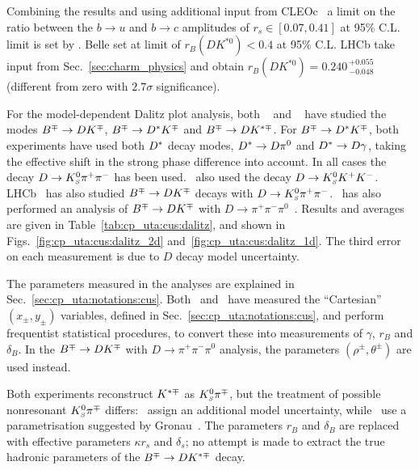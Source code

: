 

Combining the results and using additional input from
CLEOc~\cite{Asner:2008ft,Lowery:2009id} a limit on the ratio between the 
$b \to u$ and $b \to c$ amplitudes of $r_s \in \left[ 0.07,0.41 \right]$ 
at 95\% C.L. limit is set by \babar.
Belle set at limit of $r_B(DK^{*0}) < 0.4$ at 95\% C.L. 
LHCb take input from Sec.~\ref{sec:charm_physics} and obtain $r_B(DK^{*0}) = 0.240 \,^{+0.055}_{-0.048}$ (different from zero with $2.7\sigma$ significance). 

\label{sec:cp_uta:cus:dalitz}

For the model-dependent Dalitz plot analysis, both 
\babar~\cite{Aubert:2008bd} and
\belle~\cite{Poluektov:2010wz,Poluektov:2006ia} have studied the modes 
$B^\mp \to DK^\mp$, $B^\mp \to D^*K^\mp$ and $B^\mp \to DK^{*\mp}$.
For $B^\mp \to D^*K^\mp$,
both experiments have used both $D^*$ decay modes, $D^* \to D\pi^0$ and
$D^* \to D\gamma$, taking the effective shift in the strong phase
difference into account. 
In all cases the decay $D \to K^0_{\scriptscriptstyle S}\pi^+\pi^-$ has been used.
\babar\ also used the decay $D \to K^0_{\scriptscriptstyle S} K^+K^-$.
LHCb~\cite{Aaij:2014iba} has also studied $B^\mp \to DK^\mp$ decays with $D \to K^0_{\scriptscriptstyle S}\pi^+\pi^-$.
\babar\ has also performed an analysis of $B^\mp \to DK^\mp$ with 
$D \to \pi^+\pi^-\pi^0$~\cite{Aubert:2007ii}.
Results and averages are given in Table~\ref{tab:cp_uta:cus:dalitz}, and shown in Figs.~\ref{fig:cp_uta:cus:dalitz_2d} and~\ref{fig:cp_uta:cus:dalitz_1d}.
The third error on each measurement is due to $D$ decay model uncertainty.

The parameters measured in the analyses are explained in
Sec.~\ref{sec:cp_uta:notations:cus}.
Both \babar\ and \belle\ have measured the ``Cartesian''
$(x_\pm,y_\pm)$ variables, defined in Sec.~\ref{sec:cp_uta:notations:cus}, 
and perform frequentist statistical procedures,
to convert these into measurements of $\gamma$, $r_B$ and $\delta_B$.
In the $B^\mp \to DK^\mp$ with $D \to \pi^+\pi^-\pi^0$ analysis,
the parameters $(\rho^{\pm}, \theta^\pm)$ are used instead.

Both experiments reconstruct $K^{*\mp}$ as $K^0_{\scriptscriptstyle S}\pi^\mp$,
but the treatment of possible nonresonant $K^0_{\scriptscriptstyle S}\pi^\mp$ differs:
\belle\ assign an additional model uncertainty,
while \babar\ use a parametrisation suggested by Gronau~\cite{Gronau:2002mu}.
The parameters $r_B$ and $\delta_B$ are replaced with 
effective parameters $\kappa r_s$ and $\delta_s$;
no attempt is made to extract the true hadronic parameters 
of the $B^\mp \to DK^{*\mp}$ decay.


